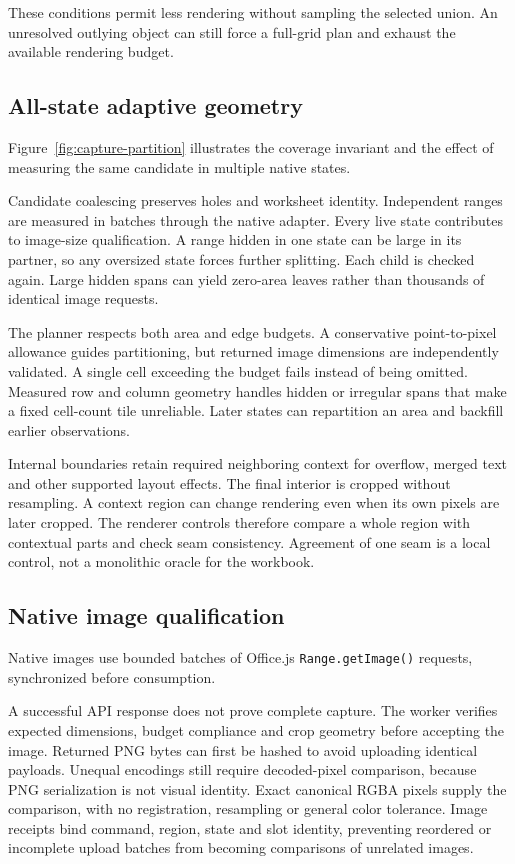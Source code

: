 These conditions permit less rendering without sampling the selected union.
An unresolved outlying object can
still force a full-grid plan and exhaust the available rendering budget.

\subsection{All-state adaptive geometry}
Figure~\ref{fig:capture-partition} illustrates the coverage invariant and the
effect of measuring the same candidate in multiple native states.

Candidate coalescing preserves holes and worksheet identity. Independent ranges
are measured in batches through the native adapter. Every live state contributes
to image-size qualification. A range hidden in one state can be large in its
partner, so any oversized state forces further splitting. Each child is checked
again. Large hidden spans can yield zero-area leaves rather than thousands of
identical image requests.

The planner respects both area and edge budgets. A conservative point-to-pixel
allowance guides partitioning, but returned image dimensions are independently
validated. A single cell exceeding the budget fails instead of being omitted.
Measured row and column geometry handles hidden or irregular spans that make
a fixed cell-count tile unreliable. Later states can repartition an area and
backfill earlier observations.

Internal boundaries retain required neighboring context for overflow, merged
text and other supported layout effects. The final interior is cropped without
resampling. A context region can change rendering even when its own pixels are
later cropped. The renderer controls therefore compare a whole region with
contextual parts and check seam consistency. Agreement of one seam is a local
control, not a monolithic oracle for the workbook.

\subsection{Native image qualification}
Native images use bounded batches of Office.js \texttt{Range.getImage()}
requests, synchronized before consumption.

A successful API response does not prove complete capture. The worker verifies
expected dimensions, budget compliance and crop geometry before accepting the
image. Returned PNG bytes can first be hashed to avoid uploading identical
payloads. Unequal encodings still require decoded-pixel comparison, because
PNG serialization is not visual identity. Exact canonical RGBA pixels supply
the comparison, with no registration, resampling or general color tolerance.
Image receipts bind command, region, state and slot identity, preventing reordered
or incomplete upload batches from becoming comparisons of unrelated images.

